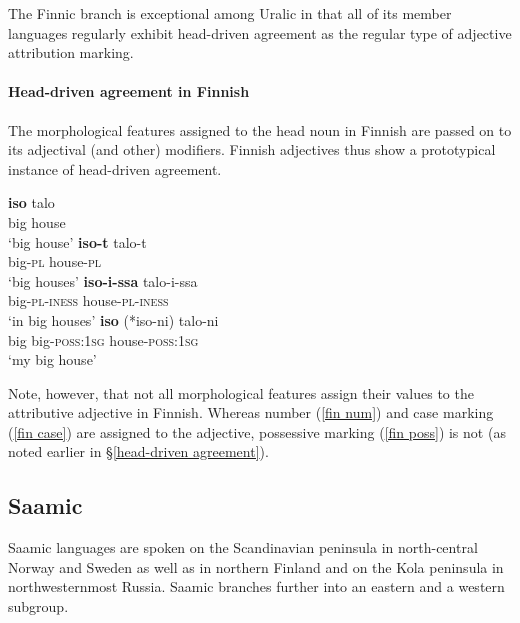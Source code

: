 The Finnic branch is exceptional among Uralic in that all of its member languages regularly exhibit head\hyp{}driven agreement as the regular type of adjective attribution marking.

\paragraph*{Head\hyp{}driven agreement in Finnish}
\label{finnish synchr}
The morphological features assigned to the head noun in Finnish are passed on to its adjectival (and other) modifiers. Finnish adjectives thus show a prototypical instance of head\hyp{}driven agreement. 
\begin{exe}
\begin{xlist}
\ex
\gll	\textbf{iso} talo\\
	big house\\
\glt	‘big house’
\ex
\label{fin num}
 \gll	\textbf{iso-t} talo-t\\
	big-\textsc{pl} house-\textsc{pl}\\
\glt	‘big houses’
\ex
\label{fin case}
\gll	\textbf{iso-i-ssa}	talo-i-ssa\\
	big-\textsc{pl}-\textsc{iness} house-\textsc{pl}-\textsc{iness}\\
\glt	‘in big houses’
\ex 	
\label{fin poss}
\gll	\textbf{iso} {(*iso-ni)} talo-ni\\
	big big-\textsc{poss:1sg} house-\textsc{poss:1sg}\\
\glt	‘my big house’
\end{xlist}
\end{exe}
Note, however, that not all morphological features assign their values to the attributive adjective in Finnish. Whereas number (\ref{fin num}) and case marking (\ref{fin case}) are assigned to the adjective, possessive marking (\ref{fin poss}) is not (as noted earlier in \S\ref{head-driven agreement}).

\subsection{Saamic}
\label{saami synchr}
Saamic languages are spoken on the Scandinavian peninsula in north-central Norway and Sweden as well as in northern Finland and on the Kola peninsula in northwesternmost Russia. Saamic branches further into an eastern and a western subgroup.

